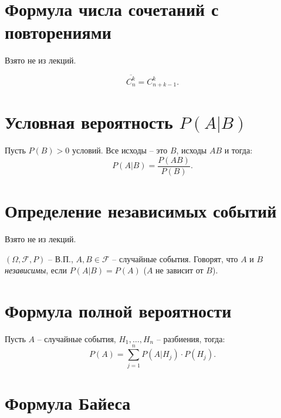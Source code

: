 \section{Формула числа сочетаний с повторениями}

\begin{note}
	Взято не из лекций.
\end{note}

\begin{definition}
	\[
		\overline{C_{n}^{k}} = C_{n+k-1}^{k}.
	\]
\end{definition}

\section{Условная вероятность $P(A | B)$}

\begin{definition}
	Пусть $P(B)> 0$ условий. Все исходы -- это $B$, исходы $AB$ и тогда:
	\[
		P(A | B) = \frac{P(AB)}{P(B)}.
	\]
\end{definition}

\section{Определение независимых событий}

\begin{note}
	Взято не из лекций.
\end{note}

\begin{definition}
	$(\Omega , \mathcal{F}, P)$ -- В.П., $A,B \in \mathcal{F}$ -- случайные события. Говорят, что $A$ и $B$ \emph{независимы}, если $P(A | B) = P(A)$ ($A$ не зависит от $B$).
\end{definition}

\section{Формула полной вероятности}

\begin{theorem}
	Пусть $A$ -- случайные события, $H_1,\ldots , H_n$ -- разбиения, тогда:
	\[
		P(A) = \sum_{j=1}^{n} P(A | H_j) \cdot P(H_j).
	\]
\end{theorem}

\newpage

\section{Формула Байеса}

